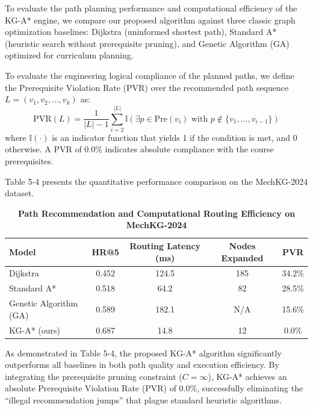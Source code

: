 \documentclass{ieeeaccess}
\begin{document}
To evaluate the path planning performance and computational efficiency of the KG-A* engine, we compare our proposed algorithm against three classic graph optimization baselines: Dijkstra (uninformed shortest path), Standard A* (heuristic search without prerequisite pruning), and Genetic Algorithm (GA) optimized for curriculum planning.

To evaluate the engineering logical compliance of the planned paths, we define the Prerequisite Violation Rate (PVR) over the recommended path sequence $L=(v_1, v_2, \dots, v_k)$ as:
\begin{equation}
\text{PVR}(L) = \frac{1}{|L|-1} \sum_{i=2}^{|L|} \mathbb{I}\left(\exists p \in \text{Pre}(v_i) \text{ with } p \notin \{v_1, \dots, v_{i-1}\}\right)
\end{equation}
where $\mathbb{I}(\cdot)$ is an indicator function that yields 1 if the condition is met, and 0 otherwise. A PVR of 0.0\% indicates absolute compliance with the course prerequisites.

Table 5-4 presents the quantitative performance comparison on the MechKG-2024 dataset.

\begin{table}[t]
\setlength{\belowcaptionskip}{0pt}
\caption{\textbf{Path Recommendation and Computational Routing Efficiency on MechKG-2024}}
\label{table5-4}
\setlength{\tabcolsep}{2pt}          %
\small                               %
\begin{tabularx}{\linewidth}{|>{\raggedright\arraybackslash}X|C|C|C|C|}
\hline
\textbf{Model} & \textbf{HR@5} & \textbf{Routing Latency (ms)} & \textbf{Nodes Expanded} & \textbf{PVR} \\
\hline
Dijkstra & 0.452 & 124.5 & 185 & 34.2\% \\
Standard A* & 0.518 & 64.2 & 82 & 28.5\% \\
Genetic Algorithm (GA) & 0.589 & 182.1 & N/A & 15.6\% \\
KG-A* (ours) & 0.687 & 14.8 & 12 & 0.0\% \\
\hline
\end{tabularx}
\end{table}

As demonstrated in Table 5-4, the proposed KG-A* algorithm significantly outperforms all baselines in both path quality and execution efficiency. By integrating the prerequisite pruning constraint ($C=\infty$), KG-A* achieves an absolute Prerequisite Violation Rate (PVR) of 0.0\%, successfully eliminating the ``illegal recommendation jumps'' that plague standard heuristic algorithms.
\end{document}
